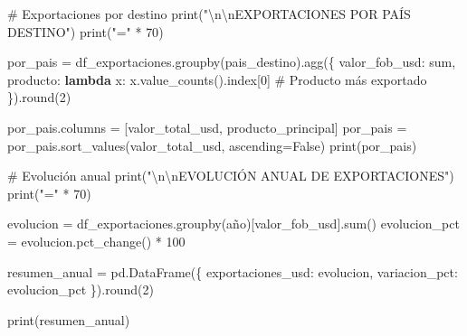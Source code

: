 \documentclass[
  doc,
  floatsintext,
  longtable,
  a4paper,
  nolmodern,
  notxfonts,
  notimes,
  12pt,
  colorlinks=true,linkcolor=blue,citecolor=blue,urlcolor=blue]{apa7}
\newenvironment{Shaded}{\begin{snugshade}}{\end{snugshade}}
\newcommand{\BuiltInTok}[1]{\textcolor[rgb]{0.00,0.23,0.31}{#1}}
\newcommand{\CharTok}[1]{\textcolor[rgb]{0.13,0.47,0.30}{#1}}
\newcommand{\CommentTok}[1]{\textcolor[rgb]{0.37,0.37,0.37}{#1}}
\newcommand{\DecValTok}[1]{\textcolor[rgb]{0.68,0.00,0.00}{#1}}
\newcommand{\KeywordTok}[1]{\textcolor[rgb]{0.00,0.23,0.31}{\textbf{#1}}}
\newcommand{\NormalTok}[1]{\textcolor[rgb]{0.00,0.23,0.31}{#1}}
\newcommand{\OperatorTok}[1]{\textcolor[rgb]{0.37,0.37,0.37}{#1}}
\newcommand{\StringTok}[1]{\textcolor[rgb]{0.13,0.47,0.30}{#1}}
\newcommand{\VariableTok}[1]{\textcolor[rgb]{0.07,0.07,0.07}{#1}}
\begin{document}
\begin{Shaded}
\begin{Highlighting}[]
\CommentTok{\# Exportaciones por destino}
\BuiltInTok{print}\NormalTok{(}\StringTok{"}\CharTok{\textbackslash{}n\textbackslash{}n}\StringTok{EXPORTACIONES POR PAÍS DESTINO"}\NormalTok{)}
\BuiltInTok{print}\NormalTok{(}\StringTok{"="} \OperatorTok{*} \DecValTok{70}\NormalTok{)}

\NormalTok{por\_pais }\OperatorTok{=}\NormalTok{ df\_exportaciones.groupby(}\StringTok{\textquotesingle{}pais\_destino\textquotesingle{}}\NormalTok{).agg(\{}
    \StringTok{\textquotesingle{}valor\_fob\_usd\textquotesingle{}}\NormalTok{: }\StringTok{\textquotesingle{}sum\textquotesingle{}}\NormalTok{,}
    \StringTok{\textquotesingle{}producto\textquotesingle{}}\NormalTok{: }\KeywordTok{lambda}\NormalTok{ x: x.value\_counts().index[}\DecValTok{0}\NormalTok{]  }\CommentTok{\# Producto más exportado}
\NormalTok{\}).}\BuiltInTok{round}\NormalTok{(}\DecValTok{2}\NormalTok{)}

\NormalTok{por\_pais.columns }\OperatorTok{=}\NormalTok{ [}\StringTok{\textquotesingle{}valor\_total\_usd\textquotesingle{}}\NormalTok{, }\StringTok{\textquotesingle{}producto\_principal\textquotesingle{}}\NormalTok{]}
\NormalTok{por\_pais }\OperatorTok{=}\NormalTok{ por\_pais.sort\_values(}\StringTok{\textquotesingle{}valor\_total\_usd\textquotesingle{}}\NormalTok{, ascending}\OperatorTok{=}\VariableTok{False}\NormalTok{)}
\BuiltInTok{print}\NormalTok{(por\_pais)}

\CommentTok{\# Evolución anual}
\BuiltInTok{print}\NormalTok{(}\StringTok{"}\CharTok{\textbackslash{}n\textbackslash{}n}\StringTok{EVOLUCIÓN ANUAL DE EXPORTACIONES"}\NormalTok{)}
\BuiltInTok{print}\NormalTok{(}\StringTok{"="} \OperatorTok{*} \DecValTok{70}\NormalTok{)}

\NormalTok{evolucion }\OperatorTok{=}\NormalTok{ df\_exportaciones.groupby(}\StringTok{\textquotesingle{}año\textquotesingle{}}\NormalTok{)[}\StringTok{\textquotesingle{}valor\_fob\_usd\textquotesingle{}}\NormalTok{].}\BuiltInTok{sum}\NormalTok{()}
\NormalTok{evolucion\_pct }\OperatorTok{=}\NormalTok{ evolucion.pct\_change() }\OperatorTok{*} \DecValTok{100}

\NormalTok{resumen\_anual }\OperatorTok{=}\NormalTok{ pd.DataFrame(\{}
    \StringTok{\textquotesingle{}exportaciones\_usd\textquotesingle{}}\NormalTok{: evolucion,}
    \StringTok{\textquotesingle{}variacion\_pct\textquotesingle{}}\NormalTok{: evolucion\_pct}
\NormalTok{\}).}\BuiltInTok{round}\NormalTok{(}\DecValTok{2}\NormalTok{)}

\BuiltInTok{print}\NormalTok{(resumen\_anual)}


\end{Highlighting}
\end{Shaded}
\end{document}
